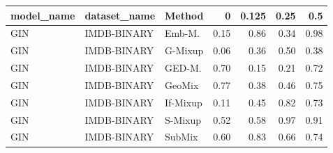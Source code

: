 
\begin{tabular}{lllrrrr}
\toprule
model_name & dataset_name & Method & 0 & 0.125 & 0.25 & 0.5\\
\midrule
GIN & IMDB-BINARY & Emb-M. & 0.15 & 0.86 & 0.34 & 0.98\\
GIN & IMDB-BINARY & G-Mixup & 0.06 & 0.36 & 0.50 & 0.38\\
GIN & IMDB-BINARY & GED-M. & 0.70 & 0.15 & 0.21 & 0.72\\
GIN & IMDB-BINARY & GeoMix & 0.77 & 0.38 & 0.46 & 0.75\\
GIN & IMDB-BINARY & If-Mixup & 0.11 & 0.45 & 0.82 & 0.73\\
GIN & IMDB-BINARY & S-Mixup & 0.52 & 0.58 & 0.97 & 0.91\\
GIN & IMDB-BINARY & SubMix & 0.60 & 0.83 & 0.66 & 0.74\\
\bottomrule
\end{tabular}
